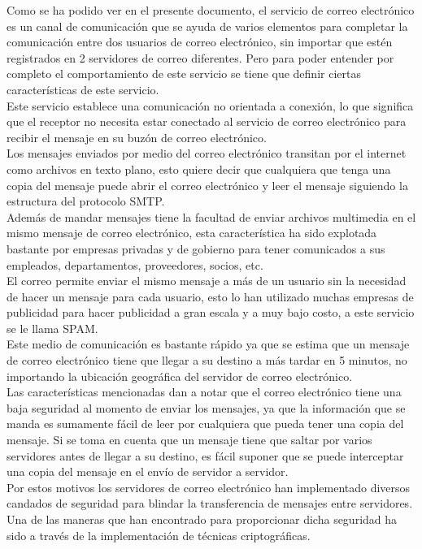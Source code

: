 Como se ha podido ver en el presente documento, el servicio de correo electrónico es un  canal  de  comunicación  que  se  ayuda  de  varios  elementos  para  completar  la 
comunicación  entre  dos  usuarios  de  correo  electrónico,  sin importar que  estén registrados en 2 servidores de correo diferentes. Pero 
para poder entender por completo el  comportamiento  de  este  servicio  se tiene  que  definir  ciertas  características  de  este servicio. 
\\
Este servicio establece una comunicación no orientada a conexión, lo que significa que el  receptor  no  necesita  estar  conectado  al  servicio  de  correo  electrónico  para  recibir  el mensaje en su buzón de correo electrónico. 
\\
Los mensajes enviados por medio del correo electrónico transitan por el   internet   como archivos  en  texto  plano,  esto  quiere  decir  que  cualquiera  que  tenga  una  copia  del 
mensaje puede abrir el correo            electrónico    y    leer    el    mensaje    siguiendo    la estructura del protocolo SMTP. 
\\
Además  de  mandar  mensajes  tiene  la  facultad  de  enviar  archivos  multimedia  en  el mismo mensaje de correo electrónico, esta característica ha sido explotada bastante por empresas   privadas   y   de   gobierno   para   tener   comunicados   a   sus empleados, departamentos, proveedores, socios, etc. 
\\
El  correo  permite  enviar  el  mismo  mensaje  a  más  de  un  usuario  sin  la  necesidad  de hacer un mensaje para cada usuario, esto lo han       utilizado     muchas     empresas     de 
publicidad para hacer publicidad a gran   escala y a muy bajo costo, a este servicio se le llama SPAM. 
\\
Este  medio  de  comunicación  es  bastante  rápido  ya  que  se  estima  que  un  mensaje  de correo  electrónico  tiene  que  llegar  a  su  destino  a  más  tardar  en  5  minutos,  no 
importando la ubicación geográfica del        servidor de correo electrónico. 
\\
Las características mencionadas  dan a notar que el correo electrónico tiene una baja seguridad al momento de enviar los mensajes, ya que la información que se manda es 
sumamente fácil de leer por cualquiera que pueda tener una copia del mensaje. Si se toma en cuenta que un mensaje tiene que saltar 
por  varios  servidores  antes  de  llegar  a  su  destino,  es  fácil  suponer  que  se puede interceptar una copia del mensaje en el envío de servidor a servidor. 
\\
Por  estos  motivos  los  servidores  de  correo  electrónico  han implementado  diversos candados  de  seguridad  para  blindar  la  transferencia  de  mensajes  entre  servidores.  Una 
de  las  maneras  que  han  encontrado  para  proporcionar  dicha seguridad  ha  sido  a través de la implementación de técnicas criptográficas. 
\\


